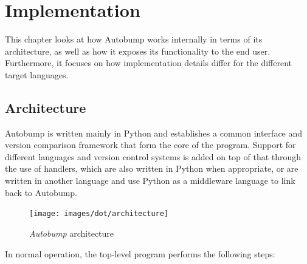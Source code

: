 \documentclass{l4proj}
\begin{document}
\chapter{Implementation}
\label{Implementation}

This chapter looks at how Autobump works internally in terms of its
architecture, as well as how it exposes its functionality to the end
user. Furthermore, it focuses on how implementation details differ for
the different target languages.

\section{Architecture}
\label{Architecture}

Autobump is written mainly in Python and establishes a common
interface and version comparison framework that form the core of the
program. Support for different languages and version control systems
is added on top of that through the use of handlers, which are also
written in Python when appropriate, or are written in another language
and use Python as a middleware language to link back to Autobump.

\begin{figure}[t]
\label{ArchitectureFig}
\centering
\texttt{[image: images/dot/architecture]}
\caption{\textit{Autobump} architecture}
\end{figure}

In normal operation, the top-level program performs the
following steps:
\end{document}
